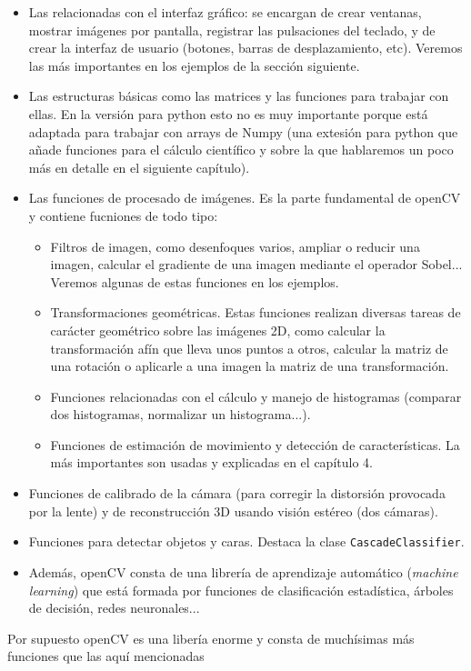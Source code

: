 \documentclass[a4paper,openright, 12pt]{book}
\begin{document}
\begin{itemize}
\item Las relacionadas con el interfaz gráfico: se encargan de crear ventanas, mostrar imágenes por pantalla, registrar las pulsaciones del teclado, y de crear la interfaz de usuario (botones, barras de desplazamiento, etc). Veremos las más importantes en los ejemplos de la sección siguiente.
\item Las estructuras básicas como las matrices y las funciones para trabajar con ellas. En la versión para python esto no es muy importante porque está adaptada para trabajar con arrays de Numpy (una extesión para python que añade funciones para el cálculo científico y sobre la que hablaremos un poco más en detalle en el siguiente capítulo).
\item Las funciones de procesado de imágenes. Es la parte fundamental de openCV y contiene fucniones de todo tipo: 
\begin{itemize}
\item Filtros de imagen, como desenfoques varios, ampliar o reducir una imagen, calcular el gradiente de una imagen mediante el operador Sobel...
\newline Veremos algunas de estas funciones en los ejemplos.
\item Transformaciones geométricas. Estas funciones realizan diversas tareas de carácter geométrico sobre las imágenes 2D, como calcular la transformación afín que lleva unos puntos a otros, calcular la matriz de una rotación o aplicarle a una imagen la matriz de una transformación.
\item Funciones relacionadas con el cálculo y manejo de histogramas (comparar dos histogramas, normalizar un histograma...).
\item Funciones de estimación de movimiento y detección de características. La más importantes son usadas y explicadas en el capítulo 4.
\end{itemize}
\item Funciones de calibrado de la cámara (para corregir la distorsión provocada por la lente) y de reconstrucción 3D usando visión estéreo (dos cámaras).
\item Funciones para detectar objetos y caras. Destaca la clase \lstinline|CascadeClassifier|.
\item Además, openCV consta de una librería de aprendizaje automático (\textit{machine learning}) que está formada por funciones de clasificación estadística, árboles de decisión, redes neuronales...
\end{itemize}
Por supuesto openCV es una libería enorme y consta de muchísimas más funciones que las aquí mencionadas\newpage
\end{document}
